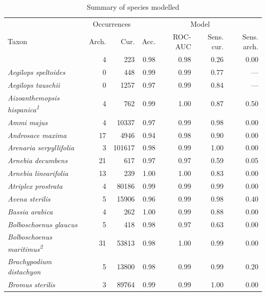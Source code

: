 \documentclass[
  authoryear,
  preprint]{elsarticle}
\begin{document}
\begingroup
\setlength{}
\setlength{}\fontsize{8.2pt}{9.9pt}\selectfont
\setlength{\LTpost}{0mm}

\begin{longtable}{@{\extracolsep{\fill}}lrrrrrr}

\caption{\label{tbl-results-summary}Summary of species modelled}

\tabularnewline

\toprule
 & \multicolumn{2}{c}{Occurrences} & \multicolumn{4}{c}{Model} \\ 
\cmidrule(lr){2-3} \cmidrule(lr){4-7}
Taxon & Arch. & Cur. & Acc. & ROC-AUC & Sens. cur. & Sens. arch. \\ 
\midrule\addlinespace[2.5pt]
{\itshape Aegilops crassa} & 4 & 223 & 0.98 & 0.98 & 0.26 & 0.00 \\ 
{\itshape Aegilops speltoides} & 0 & 448 & 0.99 & 0.99 & 0.77 & — \\ 
{\itshape Aegilops tauschii} & 0 & 1257 & 0.97 & 0.99 & 0.84 & — \\ 
{\itshape Aizoanthemopsis hispanica}\textsuperscript{\textit{1}} & 4 & 762 & 0.99 & 1.00 & 0.87 & 0.50 \\ 
{\itshape Ammi majus} & 4 & 10337 & 0.97 & 0.99 & 0.98 & 0.00 \\ 
{\itshape Androsace maxima} & 17 & 4946 & 0.94 & 0.98 & 0.90 & 0.00 \\ 
{\itshape Arenaria serpyllifolia} & 3 & 101617 & 0.98 & 0.99 & 1.00 & 0.00 \\ 
{\itshape Arnebia decumbens} & 21 & 617 & 0.97 & 0.97 & 0.59 & 0.05 \\ 
{\itshape Arnebia linearifolia} & 13 & 239 & 1.00 & 1.00 & 0.83 & 0.00 \\ 
{\itshape Atriplex prostrata} & 4 & 80186 & 0.99 & 0.99 & 0.99 & 0.00 \\ 
{\itshape Avena sterilis} & 5 & 15906 & 0.96 & 0.99 & 0.98 & 0.40 \\ 
{\itshape Bassia arabica} & 4 & 262 & 1.00 & 0.99 & 0.88 & 0.00 \\ 
{\itshape Bolboschoenus glaucus} & 5 & 418 & 0.98 & 0.97 & 0.63 & 0.00 \\ 
{\itshape Bolboschoenus maritimus}\textsuperscript{\textit{2}} & 31 & 53813 & 0.98 & 1.00 & 0.99 & 0.00 \\ 
{\itshape Brachypodium distachyon} & 5 & 13800 & 0.98 & 0.99 & 0.99 & 0.20 \\ 
{\itshape Bromus sterilis} & 3 & 89764 & 0.99 & 0.99 & 1.00 & 0.00 \\ 

\end{longtable}
\end{document}
